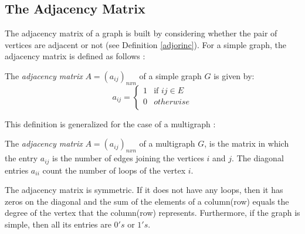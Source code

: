 \subsection{The Adjacency Matrix}
The adjacency matrix of a graph is built by considering whether the pair of vertices are adjacent or not (see Definition \ref{adjorinc}). For a simple graph, the adjacency matrix is defined as follows \cite{diestel}:

\begin{defn}
	The \textit{adjacency matrix} $ A= (a_{ij})_{nxn}$ of a simple graph $G$ is given by:
\begin{equation}		
		a_{ij} = \begin{cases}
		1 & \text{if $ij \in E$} \\
		0 & otherwise \\
		\end{cases}
\end{equation}	
\end{defn}

This definition is generalized for the case of a multigraph \cite{wilsonwatkins}:

\begin{defn}
	The \textit{adjacency matrix} $ A= (a_{ij})_{nxn}$ of a multigraph $G$, is the matrix in which the entry $a_{ij}$ is the number of edges joining the vertices $i$ and $j$. The diagonal entries $a_{ii}$ count the number of loops of the vertex $i$.
		
\end{defn}

The adjacency matrix is symmetric. If it does not have any loops, then it has zeros on the diagonal and the sum of the elements of a column(row) equals the degree of the vertex that the column(row) represents. Furthermore, if the graph is simple, then all its entries are $0's$ or $1's$.\\


